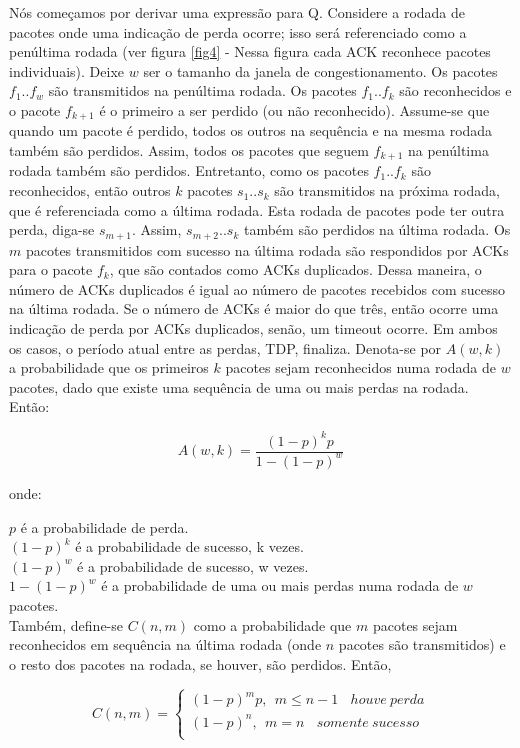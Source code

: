 Nós começamos por derivar uma expressão para Q. Considere a rodada de pacotes onde uma indicação de perda ocorre; isso será referenciado como a penúltima rodada (ver figura \ref{fig4} - Nessa figura cada ACK reconhece pacotes individuais). Deixe $w$ ser o tamanho da janela de congestionamento. Os pacotes $f_1..f_w$ são transmitidos na penúltima rodada. Os pacotes $f_1..f_k$ são reconhecidos e o pacote $f_{k+1}$ é o primeiro a ser perdido (ou não reconhecido). Assume-se que quando um pacote é perdido, todos os outros na sequência e na mesma rodada também são perdidos. Assim, todos os pacotes que seguem $f_{k+1}$ na penúltima rodada também são perdidos. Entretanto, como os pacotes $f_1..f_k$ são reconhecidos, então outros $k$ pacotes $s_1..s_k$ são transmitidos na próxima rodada, que é referenciada como a última rodada. Esta rodada de pacotes pode ter outra perda, diga-se $s_{m+1}$. Assim, $s_{m+2}..s_k$ também são perdidos na última rodada. Os $m$ pacotes transmitidos com sucesso na última rodada são respondidos por ACKs para o pacote $f_k$, que são contados como ACKs duplicados. Dessa maneira, o número de ACKs duplicados é igual ao número de pacotes recebidos com sucesso na última rodada. Se o número de ACKs é maior do que três, então ocorre uma indicação de perda por ACKs duplicados, senão, um timeout ocorre. Em ambos os casos, o período atual entre as perdas, TDP, finaliza. Denota-se por $A(w,k)$ a probabilidade que os primeiros $k$ pacotes sejam reconhecidos numa rodada de $w$ pacotes, dado que existe uma sequência de uma ou mais perdas na rodada. Então:

$$A(w, k) = \frac{(1-p)^kp}{1-(1-p)^w} $$

onde:

$p$ é a probabilidade de perda. \\
$(1-p)^k$ é a probabilidade de sucesso, k vezes. \\
$(1-p)^w$ é a probabilidade de sucesso, w vezes. \\
$1 - (1-p)^w$ é a probabilidade de uma ou mais perdas numa rodada de $w$ pacotes. \\

Também, define-se $C(n,m)$ como a probabilidade que $m$ pacotes sejam reconhecidos em sequência na última rodada (onde $n$ pacotes são transmitidos) e o resto dos pacotes na rodada, se houver, são perdidos. Então,

$$C(n,m) = \begin{cases} 
  (1-p)^mp,  \ \  m \leq n - 1 \ \ \ \ houve \ perda\\
  (1-p)^n,  \ \  m = n \ \ \ \ somente \ sucesso\\
\end{cases}
 $$

